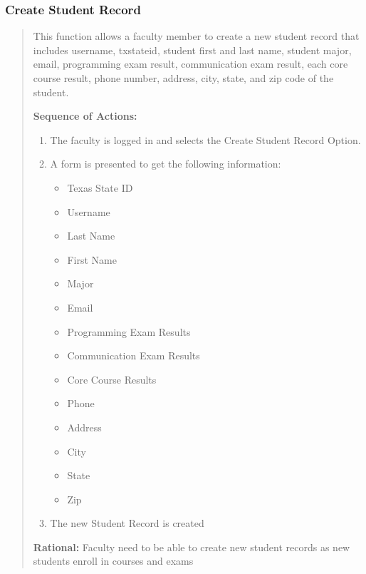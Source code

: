    \subsubsection{Create Student Record} 
   \begin{quote} %
         This function allows a faculty member to create a new student
         record that includes username, txstateid, student first and last name,
         student major, email, programming exam result, communication exam
         result, each core course result, phone number, address, city, state,
         and zip code of the student.
         
         \textbf{Sequence of Actions:}
         \begin{enumerate}
            \item The faculty is logged in and selects the Create Student Record
               Option.
            \item A form is presented to get the following information:
               \begin{itemize}
                  \item Texas State ID
                  \item Username
                  \item Last Name
                  \item First Name
                  \item Major
                  \item Email
                  \item Programming Exam Results
                  \item Communication Exam Results
                  \item Core Course Results
                  \item Phone
                  \item Address
                  \item City
                  \item State
                  \item Zip
               \end{itemize}
            \item The new Student Record is created
      \end{enumerate}

         \textbf{Rational:}
         Faculty need to be able to create new student records as new students
         enroll in courses and exams
   \end{quote} %

